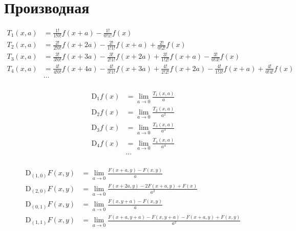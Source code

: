 
\section{Производная}

\begin{equation*}
\begin{aligned}
T_1(x,a) &= 
  \frac{1!}{1!0!} f(x + a) 
- \frac{1!}{0!1!} f(x)
\\
T_2(x,a) &= 
  \frac{2!}{2!0!} f(x + 2 a) 
- \frac{2!}{1!1!} f(x + a) 
+ \frac{2!}{0!2!} f(x)
\\
T_3(x,a) &=
  \frac{3!}{3!0!} f(x + 3 a) 
- \frac{3!}{2!1!} f(x + 2 a) 
+ \frac{3!}{1!2!} f(x + a)
- \frac{3!}{0!3!} f(x)
\\
T_4(x,a) &= 
  \frac{4!}{4!0!} f(x + 4 a) 
- \frac{4!}{3!1!} f(x + 3 a) 
+ \frac{4!}{2!2!} f(x + 2 a) 
- \frac{4!}{1!3!} f(x + a) 
+ \frac{4!}{0!4!} f(x)
\\
&\ldots
\\
\end{aligned}
\end{equation*}

\begin{equation*}
\begin{aligned}
\mathrm{D}_1 f(x) &= \lim_{a \to 0} \frac{T_1(x,a)}{a} \\
%
\mathrm{D}_2 f(x) &= \lim_{a \to 0} \frac{T_2(x,a)}{a^2} \\
%
\mathrm{D}_3 f(x) &= \lim_{a \to 0} \frac{T_3(x,a)}{a^3} \\
%
\mathrm{D}_4 f(x) &= \lim_{a \to 0} \frac{T_4(x,a)}{a^4} \\
%
&\ldots \\
\end{aligned}
\end{equation*}

\begin{equation*}
\begin{aligned}
\mathrm{D}_{(1,0)} F(x, y) &=
\lim_{a \to 0}{\frac{
  F(x + a, y)
- F(x, y)
}{a}}
\\
\mathrm{D}_{(2,0)} F(x, y) &=
\lim_{a \to 0}{\frac{
  F(x + 2 a, y)
- 2 F(x + a, y)
+ F(x)
}{a^2}}
\\
\mathrm{D}_{(0,1)} F(x, y) &=
\lim_{a \to 0}{\frac{
  F(x, y + a)
- F(x, y)
}{a}}
\\
\mathrm{D}_{(1,1)} F(x, y) &=
\lim_{a \to 0}{\frac{{
  F(x + a, y + a)
- F(x, y + a)
- F(x + a, y)
+ F(x, y)
}}{a^2}}
\\
\end{aligned}
\end{equation*}